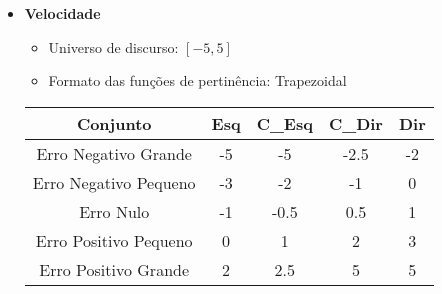 \begin{itemize}
        \item{\bf{Velocidade}}
            \begin{itemize}
                \item Universo de discurso: $[-5,5]$
                \item Formato das funções de pertinência: Trapezoidal
            \end{itemize}

            \begin{table}[H]
                \centering
                \begin{tabular}{|c|c|c|c|c|}
                    \hline
                    Conjunto               & Esq   & C\_Esq & C\_Dir & Dir \\ \hline
                    Erro Negativo Grande   & -5    & -5    & -2.5  & -2    \\
                    Erro Negativo Pequeno  & -3    & -2    & -1    & 0     \\
                    Erro  Nulo             & -1    & -0.5  & 0.5   & 1     \\
                    Erro Positivo Pequeno  & 0     & 1     & 2     & 3     \\
                    Erro Positivo Grande   & 2     & 2.5   & 5     & 5     \\ \hline
                \end{tabular}
            \end{table}
    \end{itemize}